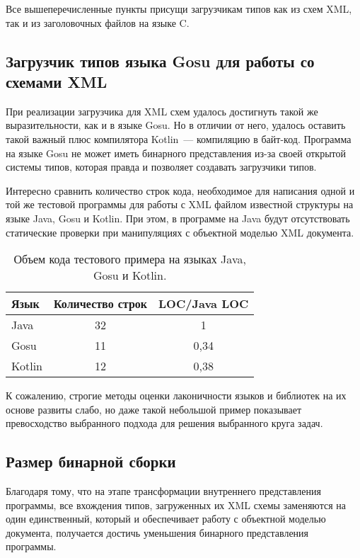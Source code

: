 Все вышеперечисленные пункты присущи загрузчикам типов как из схем XML, так и из заголовочных файлов на языке C.

\subsection{Загрузчик типов языка Gosu для работы со схемами XML}\label{xml-gosu-result}
При реализации загрузчика для XML схем удалось достигнуть такой же выразительности, как и в языке Gosu.
Но в отличии от него, удалось оставить такой важный плюс компилятора Kotlin~--- компиляцию в байт-код.
Программа на языке Gosu не может иметь бинарного представления из-за своей открытой системы типов,
которая правда и позволяет создавать загрузчики типов.

Интересно сравнить количество строк кода, необходимое для написания одной и той же тестовой программы для работы с XML файлом известной структуры на языке Java, Gosu и Kotlin.
При этом, в программе на Java будут отсутствовать статические проверки при манипуляциях с объектной моделью XML документа.

\begin{table}[!h]\begin{center}
\begin{center}
    \begin{tabular}{ | l | c | c | }
    \hline
    Язык 	& Количество строк & LOC/Java LOC \\ \hline
    Java 	& 32 	& 1 \\ \hline
    Gosu   	& 11 	& 0,34  \\ \hline
    Kotlin 	& 12 	& 0,38 \\
    \hline
    \end{tabular}
\end{center}
\caption{Объем кода тестового примера на языках Java, Gosu и Kotlin.}
\label{tab:comparation_java_gosu_kotlin}
\end{center}
\end{table}

К сожалению, строгие методы оценки лаконичности языков и библиотек на их основе развиты слабо, но даже такой небольшой пример показывает превосходство выбранного подхода для решения выбранного круга задач.

\subsection{Размер бинарной сборки}
Благодаря тому, что на этапе трансформации внутреннего представления программы, все вхождения типов, загруженных их XML схемы заменяются на один единственный, который и обеспечивает работу с объектной моделью документа, получается достичь уменьшения бинарного представления программы.

